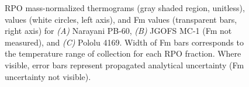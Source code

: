 \begin{figure}[p]
	\caption[RPO thermograms, , and Fm values for all samples]{RPO mass-normalized thermograms (gray shaded region, unitless),  values (white circles, left axis), and Fm values (transparent bars, right axis) for \textit{(A)} Narayani PB-60, \textit{(B)} JGOFS MC-1 (Fm not measured), and \textit{(C)} Pololu 4169. Width of Fm bars corresponds to the temperature range of collection for each RPO fraction. Where visible,  error bars represent propagated analytical uncertainty (Fm uncertainty not visible).}
	\label{Ch3Fig:2} 
\end{figure}

